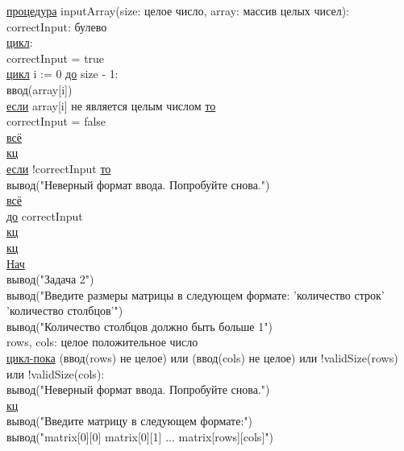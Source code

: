 \noindent \underline{процедура} inputArray(size: целое число, array: массив целых чисел):\\
\null\qquad correctInput: булево\\
\null\qquad \underline{цикл}:\\
\null\qquad \qquad correctInput = true\\
\null\qquad \qquad \underline{цикл} i := 0 \underline{до} size - 1:\\
\null\qquad \qquad \qquad ввод(array[i])\\
\null\qquad \qquad \qquad \underline{если} array[i] не является целым числом \underline{то}\\
\null\qquad \qquad \qquad \qquad correctInput = false\\
\null\qquad \qquad \qquad \underline{всё}\\
\null\qquad \qquad \underline{кц}\\
\null\qquad \qquad \underline{если} !correctInput \underline{то}\\
\null\qquad \qquad \qquad вывод("Неверный формат ввода. Попробуйте снова.")\\
\null\qquad \qquad \underline{всё}\\
\null\qquad \underline{до} correctInput\\
\null\qquad \underline{кц}\\
\underline{кц}\\

\noindent \underline{Нач}\\
\null\qquad вывод("Задача 2")\\
\null\qquad вывод("Введите размеры матрицы в следующем формате: 'количество строк' 'количество столбцов'")\\
\null\qquad вывод("Количество столбцов должно быть больше 1")\\

\noindent
\null\qquad rows, cols: целое положительное число\\
\null\qquad \underline{цикл-пока} (ввод(rows) не целое) или (ввод(cols) не целое) или !validSize(rows) или !validSize(cols):\\
\null\qquad \qquad вывод("Неверный формат ввода. Попробуйте снова.")\\
\null\qquad \underline{кц}\\

\noindent
\null\qquad вывод("Введите матрицу в следующем формате:")\\
\null\qquad вывод("matrix[0][0] matrix[0][1] ... matrix[rows][cols]")\\

